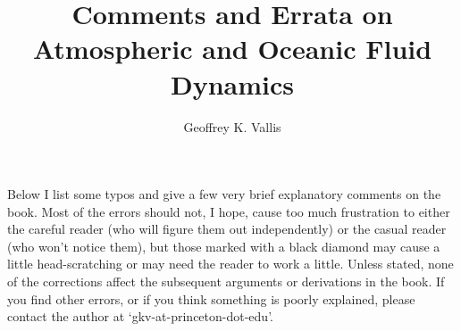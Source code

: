 \documentclass[10pt]{article}
\begin{document}
\title{\sffamily Comments and Errata on Atmospheric and Oceanic Fluid Dynamics}
\author{\sffamily Geoffrey K. Vallis}
\maketitle
%

\noindent Below I list some typos and give a few very brief explanatory comments on the book. Most of the errors should not, I hope, cause too much frustration to either the careful reader (who will figure them out independently) or the casual reader (who won't notice them), but those marked with a black diamond may cause a little head-scratching or may need the reader to work a little. Unless stated, none of the corrections affect the subsequent arguments or derivations in the book. If you find other errors, or if you think something is poorly explained, please contact the author at `gkv-at-princeton-dot-edu'. 
\end{document}

